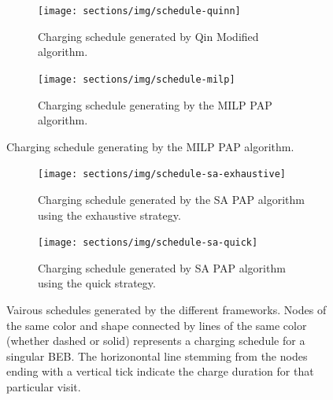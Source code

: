 \documentclass[11pt,a4paper,final]{article}
\begin{document}
\begin{figure}
  \centering
  \begin{subfigure}[t]{\textwidth}
    \centering
    \texttt{[image: sections/img/schedule-quinn]}
    \caption{Charging schedule generated by Qin Modified algorithm.}
    \label{subfig:schedule-quinn}
  \end{subfigure}

  \hfill

  \begin{subfigure}[t]{\textwidth}
    \centering
    \texttt{[image: sections/img/schedule-milp]}
    \caption{Charging schedule generating by the MILP PAP algorithm.}
    \label{subfig:schedule-milp}
  \end{subfigure}
\end{figure}

\begin{figure} \ContinuedFloat
  \centering

  \begin{subfigure}[t]{\textwidth}
    \centering \texttt{[image: sections/img/schedule-sa-exhaustive]}
    \caption{Charging schedule generated by the SA PAP algorithm using the exhaustive strategy.}
    \label{subfig:schedule-exhaustive-sa}
  \end{subfigure}

  \hfill

  \begin{subfigure}[t]{\textwidth}
    \centering \texttt{[image: sections/img/schedule-sa-quick]}
    \caption{Charging schedule generated by SA PAP algorithm using the quick strategy.}
    \label{subfig:schedule-quick-sa}
  \end{subfigure}
  \caption{Vairous schedules generated by the different frameworks. Nodes of the same color and shape connected by lines of the same color (whether dashed or solid) represents a charging schedule for a singular BEB. The horizonontal line stemming from the nodes ending with a vertical tick indicate the charge duration for that particular visit.}
  \label{fig:schedule}
\end{figure}
\end{document}

